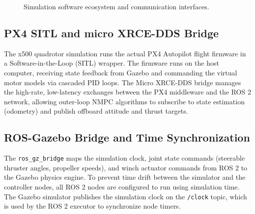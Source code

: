     \begin{figure}[htbp]
        \centering
        \caption{Simulation software ecosystem and communication interfaces.}
        \label{fig:software_architecture}
    \end{figure}

    \subsection{PX4 SITL and micro XRCE-DDS Bridge}
    The x500 quadrotor simulation runs the actual PX4 Autopilot flight firmware in a Software-in-the-Loop (SITL) wrapper. The firmware runs on the host computer, receiving state feedback from Gazebo and commanding the virtual motor models via cascaded PID loops. The Micro XRCE-DDS bridge manages the high-rate, low-latency exchanges between the PX4 middleware and the ROS 2 network, allowing outer-loop NMPC algorithms to subscribe to state estimation (odometry) and publish offboard attitude and thrust targets.

    \subsection{ROS-Gazebo Bridge and Time Synchronization}
    \label{sec:sim_gazebo_setup}
    The \texttt{ros\_gz\_bridge} maps the simulation clock, joint state commands (steerable thruster angles, propeller speeds), and winch actuator commands from ROS 2 to the Gazebo physics engine. To prevent time drift between the simulator and the controller nodes, all ROS 2 nodes are configured to run using simulation time. The Gazebo simulator publishes the simulation clock on the \texttt{/clock} topic, which is used by the ROS 2 executor to synchronize node timers.

